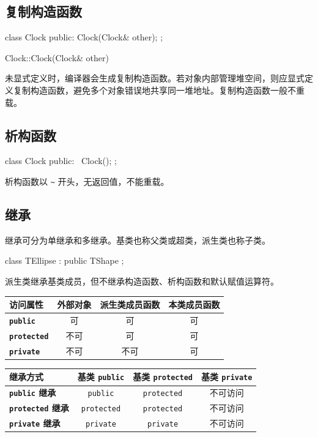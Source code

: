 \documentclass[UTF8,fontset=fandol,zihao=5]{ctexart}
\newcommand{\code}[1]{\texttt{#1}}
\begin{document}
\subsection{复制构造函数}

\begin{cppcode}[复制构造函数]
class Clock {
public:
    Clock(Clock& other);
};

Clock::Clock(Clock& other) {
}
\end{cppcode}

未显式定义时，编译器会生成复制构造函数。若对象内部管理堆空间，则应显式定义复制构造函数，避免多个对象错误地共享同一堆地址。复制构造函数一般不重载。

\subsection{析构函数}

\begin{cppcode}[析构函数]
class Clock {
public:
    ~Clock();
};
\end{cppcode}

析构函数以 \code{\~} 开头，无返回值，不能重载。

\subsection{继承}

继承可分为单继承和多继承。基类也称父类或超类，派生类也称子类。

\begin{cppcode}[继承]
class TEllipse : public TShape {
};
\end{cppcode}

派生类继承基类成员，但不继承构造函数、析构函数和默认赋值运算符。

\begin{center}
\begin{tabularx}{0.94\textwidth}{>{\bfseries}p{2.5cm}ccc}
\toprule
访问属性 & 外部对象 & 派生类成员函数 & 本类成员函数 \\
\midrule
\code{public} & 可 & 可 & 可 \\
\code{protected} & 不可 & 可 & 可 \\
\code{private} & 不可 & 不可 & 可 \\
\bottomrule
\end{tabularx}
\end{center}

\begin{center}
\begin{tabularx}{0.94\textwidth}{>{\bfseries}p{2.6cm}ccc}
\toprule
继承方式 & 基类 \code{public} & 基类 \code{protected} & 基类 \code{private} \\
\midrule
\code{public} 继承 & \code{public} & \code{protected} & 不可访问 \\
\code{protected} 继承 & \code{protected} & \code{protected} & 不可访问 \\
\code{private} 继承 & \code{private} & \code{private} & 不可访问 \\
\bottomrule
\end{tabularx}
\end{center}
\end{document}
